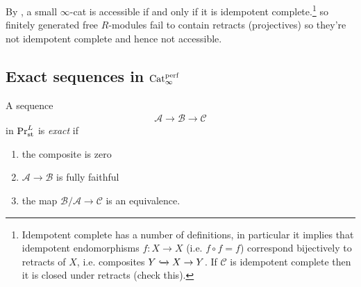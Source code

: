 \begin{remark} By \cite[5.4.3.6]{HTT}, a small $\infty$-cat is accessible if and only if it is idempotent complete.\footnote{Idempotent complete has a number of definitions, in particular it implies that idempotent endomorphisms $f \colon X \to X$ (i.e. $f\circ f = f$) correspond bijectively to retracts of $X$, i.e. composites $Y \xhookrightarrow{} X \to Y$. If $\mathscr{C}$ is idempotent complete then it is closed under retracts (\todo check this).} so finitely generated free $R$-modules fail to contain retracts (projectives) so they're not idempotent complete and hence not accessible.
\end{remark}

\subsection{Exact sequences in $\mathrm{Cat}_\infty^{\mathrm{perf}}$}

\begin{definition}\label{def:exact-sequence-PrLst}
\cite[5.8]{BGT} A sequence
\begin{align*}
    \mathcal{A} \to \mathcal{B} \to \mathcal{C}
\end{align*}
in $\mathrm{Pr}^L_{\mathrm{st}}$ is \textit{exact} if
\begin{enumerate}
    \item the composite is zero
    \item $\mathcal{A} \to \mathcal{B}$ is fully faithful
    \item the map $\mathcal{B}/\mathcal{A} \to \mathcal{C}$ is an equivalence.
\end{enumerate}
\end{definition}

